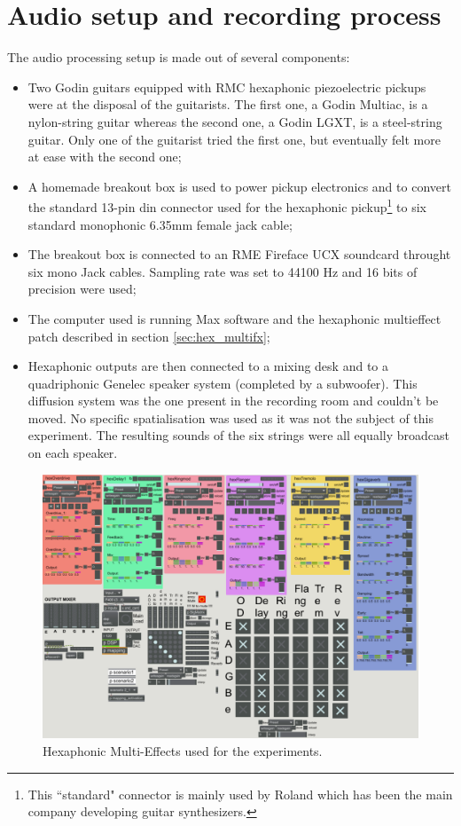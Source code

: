\documentclass{article}
\begin{document}
\section{Audio setup and recording process}\label{sec:setup}
The audio processing setup is made out of several components: 
\begin{itemize}
    \item Two Godin guitars equipped with RMC hexaphonic piezoelectric pickups were at the disposal of the guitarists. 
    The first one, a Godin Multiac, is a nylon-string guitar whereas the second one, a Godin LGXT, is a steel-string 
    guitar. Only one of the guitarist tried the first one, but eventually felt more at ease with the second one;
    \item A homemade breakout box is used to power pickup electronics and to convert the standard 13-pin din connector 
    used for the hexaphonic pickup\footnote{This ``standard" connector is mainly used by Roland which has been the main company developing guitar synthesizers.} to six standard monophonic 6.35mm female jack cable;
    \item The breakout box is connected to an RME Fireface UCX soundcard throught six mono Jack cables. Sampling rate was 
    set to 44100 Hz and 16 bits of precision were used;
	\item The computer used is running Max software and the hexaphonic multieffect patch described in section \ref{sec:hex_multifx};
    \item Hexaphonic outputs are then connected to a mixing desk and to a quadriphonic Genelec speaker system (completed by a
    subwoofer). This diffusion system was the one present in the recording room and couldn't be moved. No specific
    spatialisation was used as it was not the subject of this experiment. The resulting sounds of the six strings were all equally broadcast on each speaker.
    
\end{itemize}

\begin{figure}
    \centering
    \includegraphics[width=\columnwidth]{figures/191025-Patch-experience.png}
    \caption{Hexaphonic Multi-Effects used for the experiments.}
    \label{fig:hex-multieffect}
\end{figure}
\end{document}
